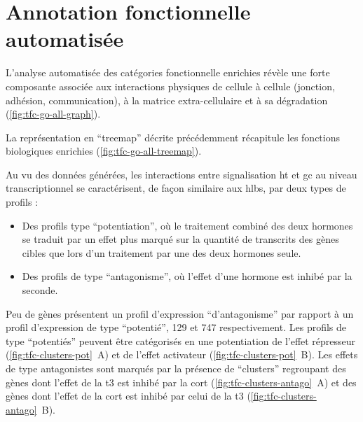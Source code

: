 \documentclass[../main.tex]{subfiles}
\begin{document}


\section{Annotation fonctionnelle automatisée}

	L'analyse automatisée des catégories fonctionnelle enrichies révèle une forte composante associée aux interactions physiques de cellule à cellule (jonction, adhésion, communication), à la matrice extra-cellulaire et à sa dégradation (\autoref{fig:tfc-go-all-graph}).

	

	La représentation en ``treemap'' décrite précédemment récapitule les fonctions biologiques enrichies (\autoref{fig:tfc-go-all-treemap}).

	

	Au vu des données générées, les interactions entre signalisation \gls{ht} et \gls{gc} au niveau transcriptionnel se caractérisent, de façon similaire aux \glspl{hlb}, par deux types de profils :
	\begin{itemize}
		\item
			Des profils type ``potentiation'', où le traitement combiné des deux hormones se traduit par un effet plus marqué sur la quantité de transcrits des gènes cibles que lors d'un traitement par une des deux hormones seule.
		\item
			Des profils de type ``antagonisme'', où l'effet d'une hormone est inhibé par la seconde.
	\end{itemize}
	\par
	Peu de gènes présentent un profil d'expression ``d'antagonisme'' par rapport à un profil d'expression de type ``potentié'', 129 et 747 respectivement.
	Les profils de type ``potentiés'' peuvent être catégorisés en une potentiation de l'effet répresseur (\autoref{fig:tfc-clusters-pot}~A) et de l'effet activateur (\autoref{fig:tfc-clusters-pot}~B).
	Les effets de type antagonistes sont marqués par la présence de ``clusters'' regroupant des gènes dont l'effet de la \gls{t3} est inhibé par la \gls{cort} (\autoref{fig:tfc-clusters-antago}~A) et des gènes dont l'effet de la \gls{cort} est inhibé par celui de la \gls{t3} (\autoref{fig:tfc-clusters-antago}~B).

	
\end{document}
